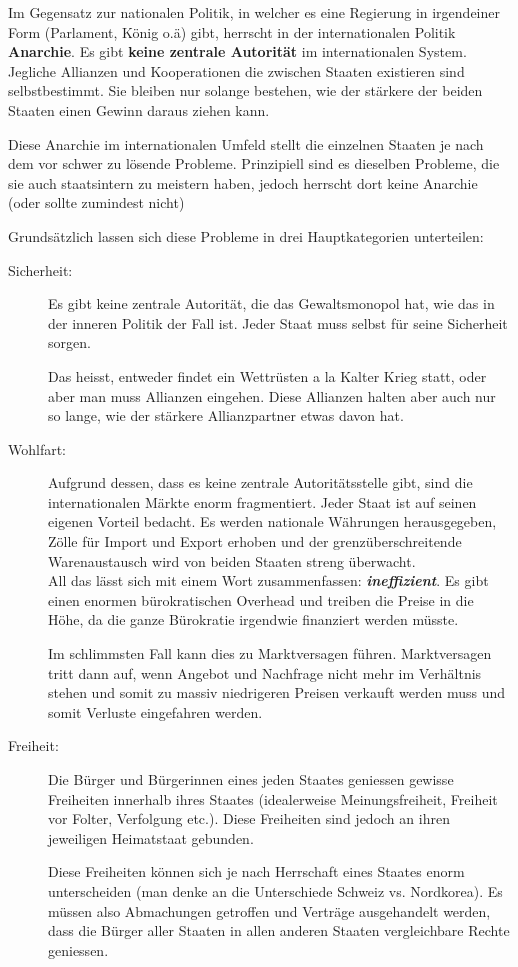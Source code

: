 \documentclass[a4paper, 11pt]{article}
\begin{document}
\vspace{10px}

Im Gegensatz zur nationalen Politik, in welcher es eine Regierung in irgendeiner Form (Parlament, König o.ä) gibt, herrscht in der internationalen Politik \textbf{Anarchie}. Es gibt \textbf{keine zentrale Autorität} im internationalen System. Jegliche Allianzen und Kooperationen die zwischen Staaten existieren sind selbstbestimmt. Sie bleiben nur solange bestehen, wie der stärkere der beiden Staaten einen Gewinn daraus ziehen kann.

Diese Anarchie im internationalen Umfeld stellt die einzelnen Staaten je nach dem vor schwer zu lösende Probleme. Prinzipiell sind es dieselben Probleme, die sie auch staatsintern zu meistern haben, jedoch herrscht dort keine Anarchie (oder sollte zumindest nicht)

Grundsätzlich lassen sich diese Probleme in drei Hauptkategorien unterteilen:


\begin{description}
	\item[Sicherheit: ] Es gibt keine zentrale Autorität, die das Gewaltsmonopol hat, wie das in der inneren Politik der Fall ist. Jeder Staat muss selbst für seine Sicherheit sorgen.
	
	
	Das heisst, entweder findet ein Wettrüsten a la Kalter Krieg statt, oder aber man muss Allianzen eingehen. Diese Allianzen halten aber auch nur so lange, wie der stärkere Allianzpartner etwas davon hat.
	\item[Wohlfart: ] Aufgrund dessen, dass es keine zentrale Autoritätsstelle 	gibt, sind die internationalen Märkte enorm fragmentiert. Jeder Staat ist auf seinen eigenen Vorteil bedacht. Es werden nationale Währungen herausgegeben, Zölle für Import und Export erhoben und der grenzüberschreitende Warenaustausch wird von beiden Staaten streng überwacht. \\
	All das lässt sich mit einem Wort zusammenfassen: \textit{\textbf{ineffizient}}. Es gibt einen enormen bürokratischen Overhead und treiben die Preise in die Höhe, da die ganze Bürokratie irgendwie finanziert werden müsste.
	
	
	Im schlimmsten Fall kann dies zu Marktversagen führen. Marktversagen tritt dann auf, wenn Angebot und Nachfrage nicht mehr im Verhältnis stehen und somit zu massiv niedrigeren Preisen verkauft werden muss und somit Verluste eingefahren werden.
	
	\item[Freiheit: ] Die Bürger und Bürgerinnen eines jeden Staates geniessen gewisse Freiheiten innerhalb ihres Staates (idealerweise Meinungsfreiheit, Freiheit vor Folter, Verfolgung etc.). Diese Freiheiten sind jedoch an ihren jeweiligen Heimatstaat gebunden.
	
	
	Diese Freiheiten können sich je nach Herrschaft eines Staates enorm unterscheiden (man denke an die Unterschiede Schweiz vs. Nordkorea). Es müssen also Abmachungen getroffen und Verträge ausgehandelt werden, dass die Bürger aller Staaten in allen anderen Staaten vergleichbare Rechte geniessen.
\end{description}
\end{document}
